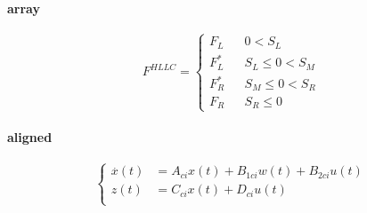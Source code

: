 \paragraph{array}
$$ F^{HLLC}=\left\{
\begin{array}{rcl}
F_L       &      & {0      <      S_L}\\
F^*_L     &      & {S_L \leq 0 < S_M}\\
F^*_R     &      & {S_M \leq 0 < S_R}\\
F_R       &      & {S_R \leq 0}
\end{array} \right. $$
    
\paragraph{aligned}
\begin{equation}
    \left\{
     \begin{aligned}
     \overset{.}x(t) &=A_{ci}x(t)+B_{1ci}w(t)+B_{2ci}u(t)  \\
     z(t) &=C_{ci}x(t)+D_{ci}u(t) \\
     \end{aligned}
     \right.
\end{equation}


